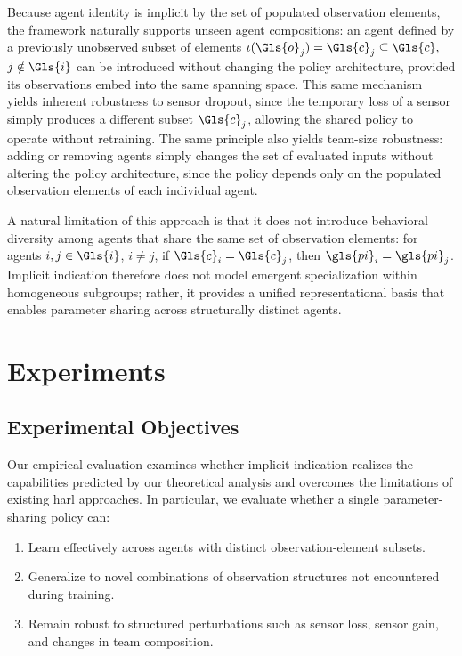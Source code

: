 \documentclass[]{jair}
\begin{document}
Because agent identity is implicit by the set of populated observation elements, 
the framework naturally supports unseen agent compositions: 
an agent defined by a previously unobserved subset of elements 
\(\iota(\Gls{o}_j) = \Gls{c}_j \subseteq \Gls{c},\) \(j \notin \Gls{i}\)
can be introduced without changing the policy architecture, 
provided its observations embed into the same spanning space. 
This same mechanism yields inherent robustness to sensor dropout, 
since the temporary loss of a sensor simply produces a 
different subset \(\Gls{c}_j\), %
allowing the shared policy to operate without retraining.
The same principle also yields team-size robustness: 
adding or removing agents simply changes the set of evaluated inputs 
without altering the policy architecture, since the policy depends 
only on the populated observation elements of each individual agent.

A natural limitation of this approach is that it does not introduce behavioral 
diversity among agents that share the same set of observation elements: 
for agents \(i,j \in \Gls{i}\), \(i\neq j\), 
if \(\Gls{c}_i = \Gls{c}_j\), then \(\gls{pi}_i = \gls{pi}_j\).
Implicit indication therefore does not model emergent specialization 
within homogeneous subgroups; rather, it provides a unified representational 
basis that enables parameter sharing across structurally distinct agents.

\section{Experiments}
\label{con2:sec:experiments}

\subsection{Experimental Objectives}

Our empirical evaluation examines whether implicit indication 
realizes the capabilities predicted by our theoretical analysis 
and overcomes the limitations of existing \gls{harl} approaches. 
In particular, we evaluate whether a single parameter-sharing policy can:
\begin{enumerate}
    \item Learn effectively across agents with distinct observation-element subsets.
    \item Generalize to novel combinations of observation structures not encountered during training.
    \item Remain robust to structured perturbations such as sensor loss, sensor gain,
          and changes in team composition.
\end{enumerate}
\end{document}
